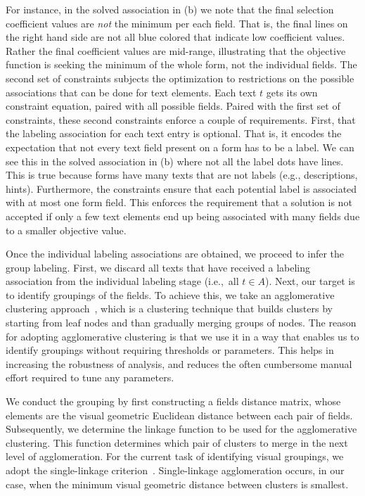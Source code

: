 For instance, in the solved association in (b) we note that 
the final selection coefficient values are \emph{not} the minimum per each field. That is, 
the final lines on the right hand side are not all blue colored that indicate low coefficient 
values. Rather the final coefficient values are mid-range, illustrating that the 
objective function is seeking the minimum of the whole form, not the individual fields. 
The second set of constraints subjects the optimization to restrictions on the possible 
associations that can be done for text elements. Each text $t$ gets its own 
constraint equation, paired with all possible fields. Paired with the first set 
of constraints, these second constraints enforce a couple of requirements. First, 
that the labeling association for each text entry is optional. That is, it 
encodes the expectation that not every text field present on a form has to be 
a label. We can see this in the solved association in (b) 
where not all the label dots have lines. This is true because forms have many 
texts that are not labels (e.g., descriptions, hints). Furthermore, the constraints 
ensure that each potential label is associated with at most one form field. This enforces the requirement that a solution is not accepted if only a few text elements end up being associated with many fields due to a smaller objective value. 

Once the individual labeling associations are obtained, we proceed to infer the group labeling. First, we discard all texts that have received a labeling association from the individual labeling stage (i.e.,~all $t \in A$). Next, 
our target is to identify groupings of the fields. To achieve this, we take an 
agglomerative clustering approach~\cite{gan_ma_wu_2021}, which is a clustering technique that builds clusters by starting from leaf nodes and than gradually merging groups of nodes. 
The reason for adopting agglomerative clustering is that we use it in a way that enables us to identify groupings without requiring thresholds or parameters. This helps 
in increasing the robustness of analysis, and reduces the often cumbersome manual effort required to tune any parameters. 

We conduct the grouping by first constructing a 
fields distance matrix, whose elements are the visual geometric 
Euclidean distance between each pair of fields. Subsequently, we 
determine the linkage function to be used for the agglomerative 
clustering. This function determines which pair of clusters to 
merge in the next level of agglomeration. For the current task 
of identifying visual groupings, we adopt the single-linkage 
criterion~\cite{gan_ma_wu_2021}. Single-linkage agglomeration 
occurs, in our case, when the minimum visual geometric distance 
between clusters is smallest. 

